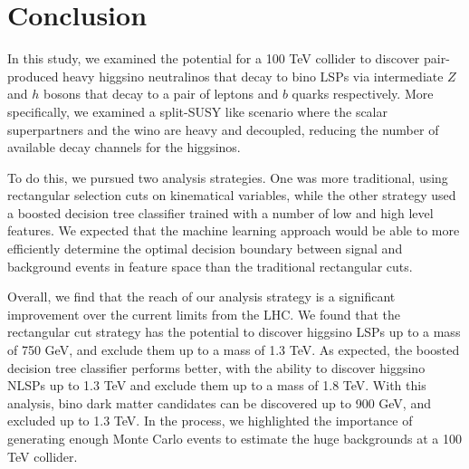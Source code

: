 \section{Conclusion}\label{sec:conclusion}

In this study, we examined the potential for a 100 TeV collider to discover pair-produced heavy higgsino neutralinos that decay to bino LSPs via intermediate $Z$ and $h$ bosons that decay to a pair of leptons and $b$ quarks respectively.  More specifically, we examined a split-SUSY like scenario where the scalar superpartners and the wino are heavy and decoupled, reducing the number of available decay channels for the higgsinos.

To do this, we pursued two analysis strategies. One was more traditional, using rectangular selection cuts on kinematical variables, while the other strategy used a boosted decision tree classifier trained with a number of low and high level features. We expected that the machine learning approach would be able to more efficiently determine the optimal decision boundary between signal and background events in feature space than the traditional rectangular cuts.

Overall, we find that the reach of our analysis strategy is a significant improvement over the current limits from the LHC. We found that the rectangular cut strategy has the potential to discover higgsino LSPs up to a mass of 750 GeV, and exclude them up to a mass of 1.3 TeV. As expected, the boosted decision tree classifier performs better, with the ability to discover higgsino NLSPs up to 1.3 TeV and exclude them up to a mass of 1.8 TeV. With this analysis, bino dark matter candidates can be discovered up to 900 GeV, and excluded up to 1.3 TeV. In the process, we highlighted the importance of generating enough Monte Carlo events to estimate the huge backgrounds at a 100 TeV collider. 

